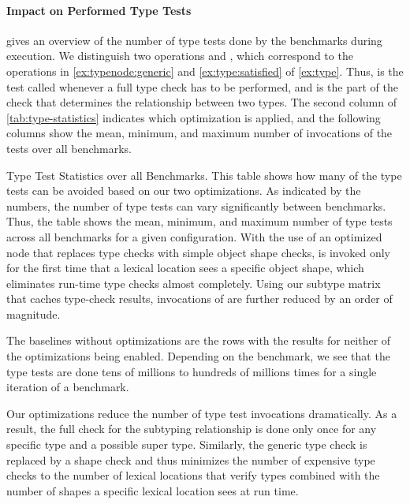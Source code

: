 \paragraph*{Impact on Performed Type Tests}

 gives an overview of the number of type tests done
by the benchmarks during execution.
We distinguish two operations  and ,
which correspond to the operations in
 \cref{ex:typenode:generic} and \cref{ex:type:satisfied} of \cref{ex:type}.
Thus,  is the test called
whenever a full type check has to be performed,
and  is the part of the check that
determines the relationship between two types.
The second column of \cref{tab:type-statistics} indicates
which optimization is applied,
and the following columns show the mean,
minimum, and maximum number of invocations of the tests
over all benchmarks.

\begin{table}[htb]
  \caption{Type Test Statistics over all Benchmarks.
  This table shows how many of the type tests can be avoided based on our two optimizations.
  As indicated by the numbers, the number of type tests can vary significantly
  between benchmarks.
  Thus, the table shows the mean, minimum, and maximum number of type tests
  across all benchmarks for a given configuration.
  With the use of an optimized node that replaces type checks with simple object shape checks,
   is invoked only for the first time that a lexical location
  sees a specific object shape, which eliminates run-time type checks almost completely.
  Using our subtype matrix that caches type-check results,
  invocations of  are further reduced by an order of magnitude.}
  \label{tab:type-statistics}

  \begin{center}
    \TypingStatsTable{}
  \end{center}
\end{table}

The baselines without optimizations are the rows with the results
for neither of the optimizations being enabled.
Depending on the benchmark,
we see that the type tests
are done tens of millions
to hundreds of millions times
for a single iteration of a benchmark.

Our optimizations reduce the number of type test invocations dramatically.
As a result, the full check for the subtyping relationship is done only once for
any specific type and a possible super type.
Similarly, the generic type check is replaced by a shape check
and thus minimizes the number of expensive type checks
to the number of lexical locations that verify types
combined with the number of shapes a specific lexical
location sees at run time.

